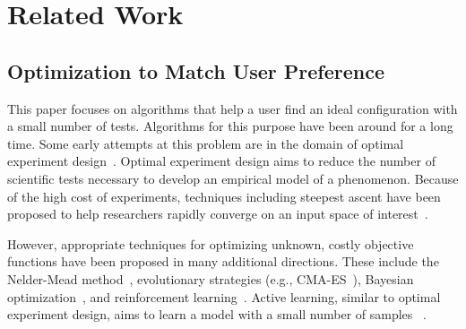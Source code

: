 \section{Related Work}

\subsection{Optimization to Match User Preference}

This paper focuses on algorithms that help a user find an ideal configuration with a small number of tests.
Algorithms for this purpose have been around for a long time.
Some early attempts at this problem are in the domain of optimal experiment design~\cite{box_empirical_1987}.
Optimal experiment design aims to reduce the number of scientific tests necessary to develop an empirical model of a phenomenon.
Because of the high cost of experiments, techniques including steepest ascent have been proposed to help researchers rapidly converge on an input space of interest~\cite{box_empirical_1987}.

However, appropriate techniques for optimizing unknown, costly objective functions have been proposed in many additional directions.
These include the Nelder-Mead method~\cite{nelder_simplex_1965},
evolutionary strategies (e.g., CMA-ES~\cite{hansen_adapting_1996}),
Bayesian optimization~\cite{brochu_tutorial_2010},
and reinforcement learning~\cite{sutton_reinforcement_1998}.
Active learning, similar to optimal experiment design, aims to learn a model with a small number of samples~\cite{cohn_active_1996,settles_active_2010} .


